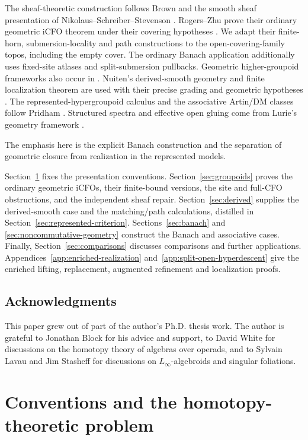 \documentclass[12pt]{amsart}
\theoremstyle{definition}
\theoremstyle{remark}
\numberwithin{equation}{section}
\begin{document}
The sheaf-theoretic construction follows Brown and the
smooth sheaf presentation of Nikolaus--Schreiber--Stevenson
\cite{Brown1973,NSS2015}.
Rogers--Zhu prove their ordinary geometric iCFO theorem
under their covering hypotheses
\cite{RogersZhu2020}. We adapt their finite-horn,
submersion-locality and path constructions to the
open-covering-family topos, including the empty cover.
The ordinary Banach application additionally uses fixed-site
atlases and split-submersion pullbacks.
Geometric higher-groupoid frameworks also occur
in \cite{BehrendGetzler2017}.
Nuiten's derived-smooth geometry and finite
localization theorem are used with their precise
grading and geometric hypotheses
\cite{NuitenThesis2018}.
The represented-hypergroupoid calculus and the
associative Artin/DM classes follow Pridham
\cite{Pridham2013,PridhamNC2023}.
Structured spectra and effective open gluing
come from Lurie's geometry framework
\cite{LurieDAGV2009}.

The emphasis here is the explicit Banach
construction and the separation of geometric
closure from realization in the represented models.

Section~\ref{sec:foundations} fixes the
presentation conventions. Section~\ref{sec:groupoids}
proves the ordinary geometric iCFOs, their finite-bound
versions, the site and full-CFO obstructions, and the
independent sheaf repair.
Section~\ref{sec:derived} supplies the derived-smooth
case and the matching/path calculations, distilled
in Section~\ref{sec:represented-criterion}.
Sections~\ref{sec:banach} and
\ref{sec:noncommutative-geometry} construct the
Banach and associative cases. Finally,
Section~\ref{sec:comparisons} discusses comparisons
and further applications.
Appendices~\ref{app:enriched-realization}
and~\ref{app:split-open-hyperdescent} give the
enriched lifting, replacement, augmented refinement
and localization proofs.

\subsection*{Acknowledgments}

This paper grew out of part of the author's Ph.D. thesis work.
The author is grateful to Jonathan Block for his advice and support,
to David White for discussions on the homotopy theory of algebras
over operads, and to Sylvain Lavau and Jim Stasheff for discussions
on $L_\infty$-algebroids and singular foliations.



\section{Conventions and the homotopy-theoretic problem}
\label{sec:foundations}
\end{document}
